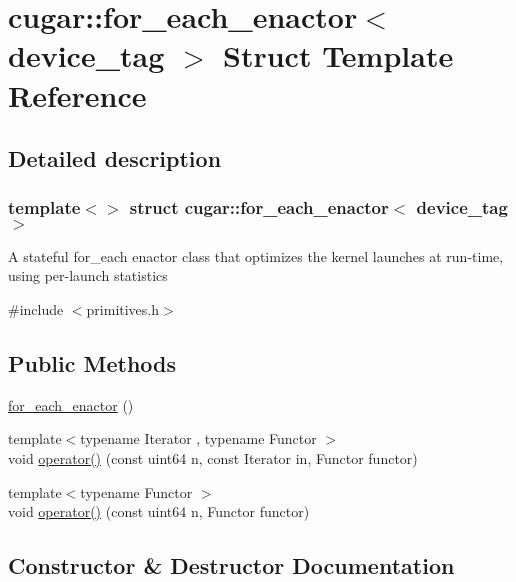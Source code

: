 \hypertarget{structcugar_1_1for__each__enactor_3_01device__tag_01_4}{}\section{cugar\+:\+:for\+\_\+each\+\_\+enactor$<$ device\+\_\+tag $>$ Struct Template Reference}
\label{structcugar_1_1for__each__enactor_3_01device__tag_01_4}


\subsection{Detailed description}
\subsubsection*{template$<$$>$\newline
struct cugar\+::for\+\_\+each\+\_\+enactor$<$ device\+\_\+tag $>$}

A stateful for\+\_\+each enactor class that optimizes the kernel launches at run-\/time, using per-\/launch statistics 

{\ttfamily \#include $<$primitives.\+h$>$}

\subsection*{Public Methods}
\begin{DoxyCompactItemize}
\item 
\hyperlink{structcugar_1_1for__each__enactor_3_01device__tag_01_4_a09149f7e19d5228d4cb45d5f741df386}{for\+\_\+each\+\_\+enactor} ()
\item 
{\footnotesize template$<$typename Iterator , typename Functor $>$ }\\void \hyperlink{structcugar_1_1for__each__enactor_3_01device__tag_01_4_a560ef3acdf14e7bbccbdaea7cdae0049}{operator()} (const uint64 n, const Iterator in, Functor functor)
\item 
{\footnotesize template$<$typename Functor $>$ }\\void \hyperlink{structcugar_1_1for__each__enactor_3_01device__tag_01_4_a5ebd67b9c8303c8d3692dc8dbd336893}{operator()} (const uint64 n, Functor functor)
\end{DoxyCompactItemize}


\subsection{Constructor \& Destructor Documentation}
\mbox{\label{structcugar_1_1for__each__enactor_3_01device__tag_01_4_a09149f7e19d5228d4cb45d5f741df386}} 
